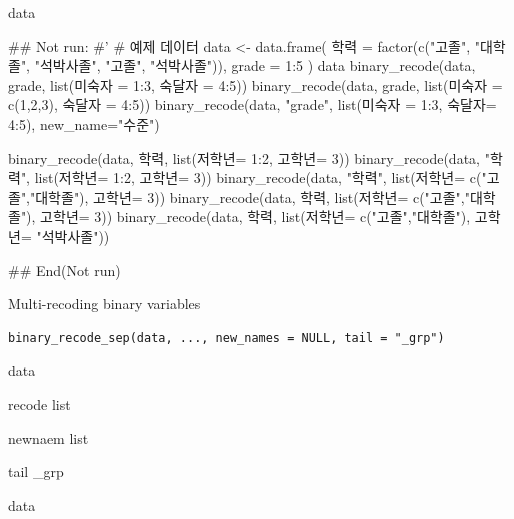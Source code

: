 \documentclass[a4paper]{book}
\begin{document}
%
\begin{Value}
data
\end{Value}
%
\begin{Examples}
\begin{ExampleCode}

\#\# Not run: 
#'
# 예제 데이터
data <- data.frame(
  학력 = factor(c("고졸", "대학졸", "석박사졸", "고졸", "석박사졸")),
  grade = 1:5
)
data
binary_recode(data, grade, list(미숙자 = 1:3, 숙달자 = 4:5))
binary_recode(data, grade, list(미숙자 = c(1,2,3), 숙달자 = 4:5))
binary_recode(data, "grade", list(미숙자 = 1:3, 숙달자= 4:5), new_name="수준")

binary_recode(data, 학력, list(저학년= 1:2, 고학년= 3))
binary_recode(data, "학력", list(저학년= 1:2, 고학년= 3))
binary_recode(data, "학력", list(저학년= c("고졸","대학졸"), 고학년= 3))
binary_recode(data, 학력, list(저학년= c("고졸","대학졸"), 고학년= 3))
binary_recode(data, 학력, list(저학년= c("고졸","대학졸"), 고학년= "석박사졸"))


## End(Not run)

\end{ExampleCode}
\end{Examples}
%
\begin{Description}
Multi-recoding binary variables
\end{Description}
%
\begin{Usage}
\begin{verbatim}
binary_recode_sep(data, ..., new_names = NULL, tail = "_grp")
\end{verbatim}
\end{Usage}
%
\begin{Arguments}
\begin{ldescription}
\item[\code{data}] data

\item[\code{...}] recode list

\item[\code{new\_names}] newnaem list

\item[\code{tail}] tail \_grp
\end{ldescription}
\end{Arguments}
%
\begin{Value}
data
\end{Value}
%
\end{document}
